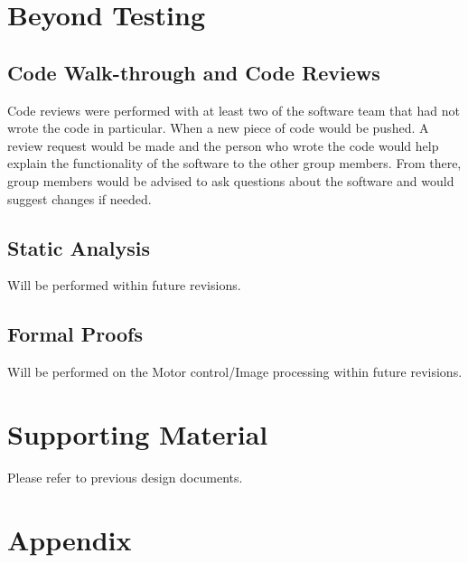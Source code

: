 \documentclass [10pt]{article}
\begin{document}
\section {Beyond Testing}

\subsection {Code Walk-through and Code Reviews}
Code reviews were performed with at least two of the software team that had not wrote the code in particular. When a new piece of code would be pushed. A review request would be made and the person who wrote the code would help explain the functionality of the software to the other group members. From there, group members would be advised to ask questions about the software and would suggest changes if needed.

\subsection {Static Analysis}
Will be performed within future revisions.

\subsection {Formal Proofs}
Will be performed on the Motor control/Image processing within future revisions.

\section {Supporting Material}

Please refer to previous design documents.

\section {Appendix}
\end{document}
